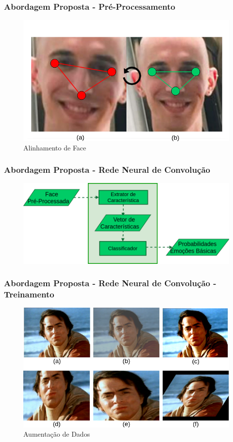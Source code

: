 \documentclass{beamer}
\begin{document}
\begin{frame}
\frametitle{Abordagem Proposta - Pré-Processamento}
\begin{figure}
\centering
\includegraphics[scale=0.26]{figuras/face_alinhada.png}
\caption{Alinhamento de Face}
\label{fig:face_alinhada}
\end{figure}
\end{frame}



\begin{frame}
\frametitle{Abordagem Proposta - Rede Neural de Convolução}
\begin{figure}
\centering
\includegraphics[scale=0.33]{figuras/abordagem_6.png}
\label{fig:arquitetura3}
\end{figure}
\end{frame}


\begin{frame}
\frametitle{Abordagem Proposta - Rede Neural de Convolução - Treinamento}
\begin{figure}
\centering
\includegraphics[scale=0.33]{figuras/augmentation.png}
\caption{Aumentação de Dados}
\label{fig:augmentation}
\end{figure}
\end{frame}
\end{document}
